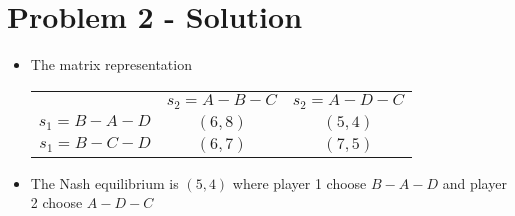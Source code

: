 \section{Problem 2 - Solution}
\begin{itemize}
        \item The matrix representation \\
        \begin{tabular}{ r|c|c| }
        \multicolumn{1}{r}{}
         &  \multicolumn{1}{c}{$s_2 = A-B-C$}
         & \multicolumn{1}{c}{$s_2 = A-D-C$} \\
        \cline{2-3}
        $s_1 = B-A-D$ & $(6,8)$ & $(5,4)$ \\
        \cline{2-3}
        $s_1 = B-C-D$ & $(6,7)$ & $(7,5)$ \\
        \cline{2-3}
        \end{tabular}
        \item The Nash equilibrium is $(5,4)$ where player 1 choose $B-A-D$ and player 2 choose $A-D-C$
\end{itemize}

